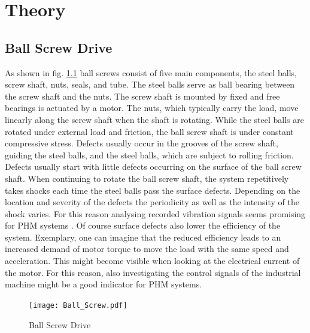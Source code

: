 \chapter{Theory}\label{chapter:theory}

\section{Ball Screw Drive}
As shown in fig. \ref{fig:Ball_Screw} ball screws consist of five main components, the steel balls, screw shaft, nuts, seals, and tube. The steel balls serve as ball bearing between the screw shaft and the nuts. The screw shaft is mounted by fixed and free bearings is actuated by a motor. The nuts, which typically carry the load, move linearly along the screw shaft when the shaft is rotating. While the steel balls are rotated under external load and friction, the ball screw shaft is under constant compressive stress. Defects usually occur in the grooves of the screw shaft, guiding the steel balls, and the steel balls, which are subject to rolling friction. Defects usually start with little defects occurring on the surface of the ball screw shaft. When continuing to rotate the ball screw shaft, the system repetitively takes shocks each time the steel balls pass the surface defects. Depending on the location and severity of the defects the periodicity as well as the intensity of the shock varies. For this reason analysing recorded vibration signals seems promising for PHM systems \cite{Lee2015}. Of course surface defects also lower the efficiency of the system. Exemplary, one can imagine that the reduced efficiency leads to an increased demand of motor torque to move the load with the same speed and acceleration. This might become visible when looking at the electrical current of the motor. For this reason, also investigating the control signals of the industrial machine might be a good indicator for PHM systems.

\begin{figure}[H]
  \centering
  \texttt{[image: Ball\_Screw.pdf]}
  \caption {Ball Screw Drive \cite{DENG2020}} \label{fig:Ball_Screw}
\end{figure}

